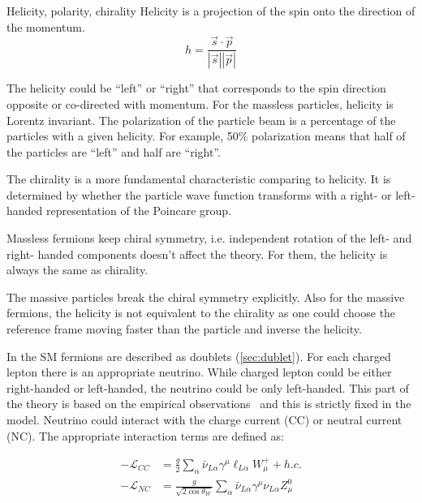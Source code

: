 \documentclass[../main.tex]{subfiles}
\begin{document}
\begin{bclogo}[couleur=blue!2, arrondi=0.1, logo=\bcinfo, nobreak=true]{Helicity, polarity, chirality}
Helicity is a projection of the spin onto the direction of the momentum.
\begin{equation}
h=\frac{\vec{s}\cdot\vec{p}}{\left|\vec{s}\right|\left|\vec{p}\right|}
\end{equation}

The helicity could be ``left'' or ``right'' that corresponds to the spin direction opposite or co-directed with momentum. For the massless particles, helicity is Lorentz invariant. The polarization of the particle beam is a percentage of the particles with a given helicity. For example, 50\% polarization means that half of the particles are ``left'' and half are ``right''.

The chirality is a more fundamental characteristic comparing to helicity. It is determined by whether the particle wave function transforms with a right- or left-handed representation of the Poincare group.

Massless fermions keep chiral symmetry, i.e. independent rotation of the left- and right- handed components doesn't affect the theory. For them, the helicity is always the same as chirality.

The massive particles break the chiral symmetry explicitly. Also for the massive fermions, the helicity is not equivalent to the chirality as one could choose the reference frame moving faster than the particle and inverse the helicity.
\end{bclogo}

In the SM fermions are described as doublets (\autoref{sec:dublet}). For each charged lepton there is an appropriate neutrino. While charged lepton could be either right-handed or left-handed, the neutrino could be only left-handed. This part of the theory is based on the empirical observations~\cite{Goldhaber1958} and this is strictly fixed in the model. Neutrino could interact with the charge current (CC) or neutral current (NC). The appropriate interaction terms are defined as:

\begin{align}
-\mathcal{L}_{CC}&=\frac{g}{2}\sum_\alpha\bar{\nu}_{L\alpha}\gamma^\mu\ell_{L\alpha}W^+_\mu+h.c. \\ \nonumber
-\mathcal{L}_{NC}&=\frac{g}{\sqrt{2\cos{\theta_W}}}\sum_\alpha\bar{\nu}_{L\alpha}\gamma^\mu\nu_{L\alpha}Z^0_\mu
\end{align}
\end{document}
